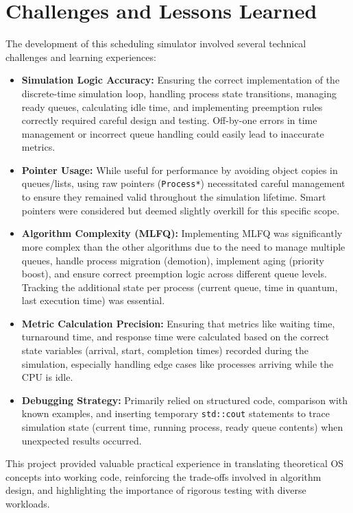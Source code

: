 \documentclass[12pt]{article}
\begin{document}
\section{Challenges and Lessons Learned}
The development of this scheduling simulator involved several technical challenges and learning experiences:
\begin{itemize}
    \item \textbf{Simulation Logic Accuracy:} Ensuring the correct implementation of the discrete-time simulation loop, handling process state transitions, managing ready queues, calculating idle time, and implementing preemption rules correctly required careful design and testing. Off-by-one errors in time management or incorrect queue handling could easily lead to inaccurate metrics.
    \item \textbf{Pointer Usage:} While useful for performance by avoiding object copies in queues/lists, using raw pointers (\texttt{Process*}) necessitated careful management to ensure they remained valid throughout the simulation lifetime. Smart pointers were considered but deemed slightly overkill for this specific scope.
    \item \textbf{Algorithm Complexity (MLFQ):} Implementing MLFQ was significantly more complex than the other algorithms due to the need to manage multiple queues, handle process migration (demotion), implement aging (priority boost), and ensure correct preemption logic across different queue levels. Tracking the additional state per process (current queue, time in quantum, last execution time) was essential.
    \item \textbf{Metric Calculation Precision:} Ensuring that metrics like waiting time, turnaround time, and response time were calculated based on the correct state variables (arrival, start, completion times) recorded during the simulation, especially handling edge cases like processes arriving while the CPU is idle.
    \item \textbf{Debugging Strategy:} Primarily relied on structured code, comparison with known examples, and inserting temporary \texttt{std::cout} statements to trace simulation state (current time, running process, ready queue contents) when unexpected results occurred.
\end{itemize}
This project provided valuable practical experience in translating theoretical OS concepts into working code, reinforcing the trade-offs involved in algorithm design, and highlighting the importance of rigorous testing with diverse workloads.
\end{document}
